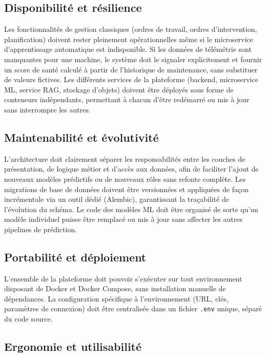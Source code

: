 \subsection{Disponibilité et résilience}

Les fonctionnalités de gestion classiques (ordres de travail, ordres d'intervention, planification) doivent rester pleinement opérationnelles même si le microservice d'apprentissage automatique est indisponible.
Si les données de télémétrie sont manquantes pour une machine, le système doit le signaler explicitement et fournir un score de santé calculé à partir de l'historique de maintenance, sans substituer de valeurs fictives.
Les différents services de la plateforme (backend, microservice ML, service RAG, stockage d'objets) doivent être déployés sous forme de conteneurs indépendants, permettant à chacun d'être redémarré ou mis à jour sans interrompre les autres.

\subsection{Maintenabilité et évolutivité}

L'architecture doit clairement séparer les responsabilités entre les couches de présentation, de logique métier et d'accès aux données, afin de faciliter l'ajout de nouveaux modèles prédictifs ou de nouveaux rôles sans refonte complète.
Les migrations de base de données doivent être versionnées et appliquées de façon incrémentale via un outil dédié (Alembic), garantissant la traçabilité de l'évolution du schéma.
Le code des modèles ML doit être organisé de sorte qu'un modèle individuel puisse être remplacé ou mis à jour sans affecter les autres pipelines de prédiction.

\subsection{Portabilité et déploiement}

L'ensemble de la plateforme doit pouvoir s'exécuter sur tout environnement disposant de Docker et Docker Compose, sans installation manuelle de dépendances.
La configuration spécifique à l'environnement (URL, clés, paramètres de connexion) doit être centralisée dans un fichier \texttt{.env} unique, séparé du code source.

\subsection{Ergonomie et utilisabilité}

